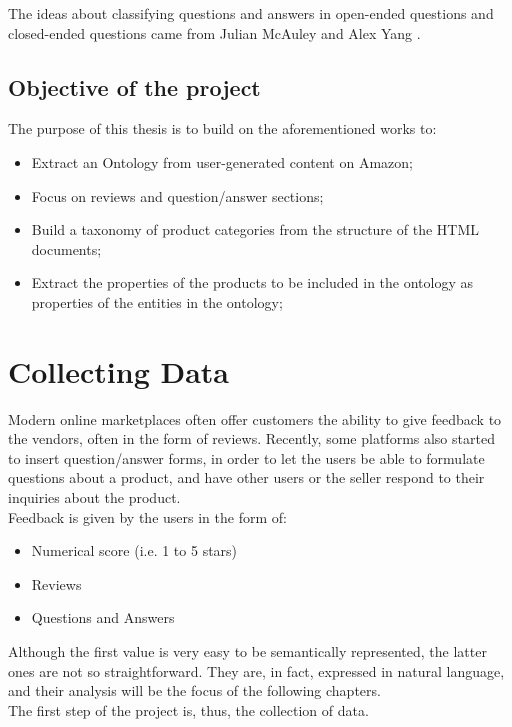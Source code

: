 \documentclass[LaM,oneside,binding=0.6cm]{sapthesis}
\begin{document}
The ideas about classifying questions and answers in open-ended questions and closed-ended questions came from Julian McAuley and Alex Yang \parencite{mcauley_addressing_2016}. 
\\

\section{Objective of the project}

The purpose of this thesis is to build on the aforementioned works to:
\begin{itemize}
	\item Extract an Ontology from user-generated content on Amazon;
	\item Focus on reviews and question/answer sections;
	\item Build a taxonomy of product categories from the structure of the HTML documents;
	\item Extract the properties of the products to be included in the ontology as properties of the entities in the ontology;
\end{itemize}


\chapter{Collecting Data}

Modern online marketplaces often offer customers the ability to give feedback to the vendors, often in the form of reviews. Recently, some platforms also started to insert question/answer forms, in order to let the users be able to formulate questions about a product, and have other users or the seller respond to their inquiries about the product. \\

Feedback is given by the users in the form of:
\begin{itemize}
	\item Numerical score (i.e. 1 to 5 stars)
	\item Reviews
	\item Questions and Answers
\end{itemize}

Although the first value is very easy to be semantically represented, the latter ones are not so straightforward. They are, in fact, expressed in natural language, and their analysis will be the focus of the following chapters. \\

The first step of the project is, thus, the collection of data. 
\end{document}
